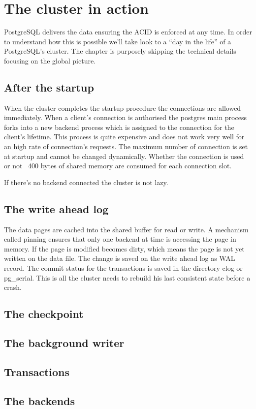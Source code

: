 \chapter{The cluster in action}
PostgreSQL delivers the data ensuring the ACID is enforced at any time. In order to understand how 
this is possible we'll take look to a ``day in the life'' of a PostgreSQL's cluster. The chapter 
is purposely skipping the technical details focusing on the global picture.


\section{After the startup}
When the cluster completes the startup procedure the connections are allowed immediately. When a 
client's connection is authorised the postgres main process forks into a new backend process which is 
assigned to the connection for the client's lifetime. This process is quite expensive and does not work 
very well for an high rate of connection's requests. The maximum number of connection is set at startup and 
cannot be changed dynamically. Whether the connection is used or not ~400 bytes of shared memory are 
consumed for each connection slot.\newline

If there's no backend connected the cluster is not lazy. 

\section{The write ahead log}
The data pages are cached into the shared buffer for read or write. A mechanism called pinning ensures that 
only one backend at time is accessing the page in memory. If the page is modified becomes dirty, which 
means the page is not yet written on the data file. The change is saved on the write ahead log as WAL
record. The commit status for the transactions is saved in the directory clog or pg\_serial. This 
is all the cluster needs to rebuild his last consistent state before a crash. 

\section{The checkpoint}

\section{The background writer}


\section{Transactions}

\section{The backends}

